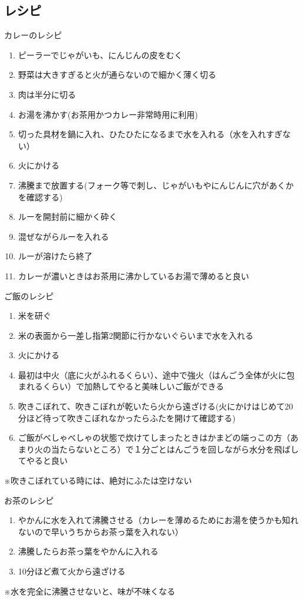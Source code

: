 \subsection{レシピ}
\begin{itembox}[l]{カレーのレシピ}
  \begin{enumerate}
    \item ピーラーでじゃがいも、にんじんの皮をむく
    \item 野菜は大きすぎると火が通らないので細かく薄く切る
    \item 肉は半分に切る
    \item お湯を沸かす(お茶用かつカレー非常時用に利用)
    \item 切った具材を鍋に入れ、ひたひたになるまで水を入れる（水を入れすぎない）
    \item 火にかける
    \item 沸騰まで放置する(フォーク等で刺し、じゃがいもやにんじんに穴があくかを確認する)
    \item ルーを開封前に細かく砕く
    \item 混ぜながらルーを入れる
    \item ルーが溶けたら終了
    \item カレーが濃いときはお茶用に沸かしているお湯で薄めると良い
  \end{enumerate}
\end{itembox}

\begin{itembox}[l]{ご飯のレシピ}
  \begin{enumerate}
    \item 米を研ぐ
    \item 米の表面から一差し指第2関節に行かないぐらいまで水を入れる
    \item 火にかける

    \item 最初は中火（底に火がふれるくらい）、途中で強火（はんごう全体が火に包まれるくらい）で加熱してやると美味しいご飯ができる
    \item 吹きこぼれて、吹きこぼれが乾いたら火から遠ざける(火にかけはじめて20分ほど待って吹きこぼれなかったらふたを開けて確認する)
    \item ご飯がべしゃべしゃの状態で炊けてしまったときはかまどの端っこの方（あまり火の当たらないところ）で１分ごとはんごうを回しながら水分を飛ばしてやると良い
  \end{enumerate}
※吹きこぼれている時には、絶対にふたは空けない
\end{itembox}

\begin{itembox}[l]{お茶のレシピ}
    \begin{enumerate}
    \item やかんに水を入れて沸騰させる（カレーを薄めるためにお湯を使うかも知れないので早いうちからお茶っ葉を入れない）
    \item 沸騰したらお茶っ葉をやかんに入れる
    \item 10分ほど煮て火から遠ざける
  \end{enumerate}
※水を完全に沸騰させないと、味が不味くなる
\end{itembox}

